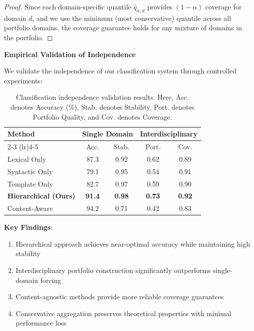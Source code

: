 \documentclass{uai2026} %
\theoremstyle{remark}
\theoremstyle{plain}
\theoremstyle{definition}
\begin{document}
\begin{proof}
Since each domain-specific quantile $\hat{q}_{\alpha,d}$ provides $(1-\alpha)$ coverage for domain $d$, and we use the minimum (most conservative) quantile across all portfolio domains, the coverage guarantee holds for any mixture of domains in the portfolio.
\end{proof}

\textbf{Empirical Validation of Independence}

We validate the independence of our classification system through controlled experiments:

\begin{table}[htb]
\centering
\caption{Classification independence validation results. Here, {Acc.} denotes Accuracy (\%), {Stab.} denotes Stability, {Port.} denotes Portfolio Quality, and {Cov.} denotes Coverage.}
\label{tab:classification-independence}

\setlength{\tabcolsep}{2pt}
\begin{tabular}{@{}lcccc@{}}
\toprule
\multirow{2}{*}{\textbf{Method}} & \multicolumn{2}{c}{\textbf{Single Domain}} & \multicolumn{2}{c}{\textbf{Interdisciplinary}} \\
\cmidrule(lr){2-3} \cmidrule(lr){4-5}
& Acc. & Stab. & Port. & Cov. \\
\midrule
Lexical Only & 87.3 & 0.92 & 0.62 & 0.89 \\
Syntactic Only & 79.1 & 0.95 & 0.54 & 0.91 \\
Template Only & 82.7 & 0.97 & 0.59 & 0.90 \\
\textbf{Hierarchical (Ours)} & \textbf{91.4} & \textbf{0.98} & \textbf{0.73} & \textbf{0.92} \\
Content-Aware & 94.2 & 0.71 & 0.42 & 0.83 \\
\bottomrule
\end{tabular}
\end{table}

\textbf{Key Findings}:
\begin{enumerate}
\item Hierarchical approach achieves near-optimal accuracy while maintaining high stability
\item Interdisciplinary portfolio construction significantly outperforms single-domain forcing
\item Content-agnostic methods provide more reliable coverage guarantees
\item Conservative aggregation preserves theoretical properties with minimal performance loss
\end{enumerate}
\end{document}
